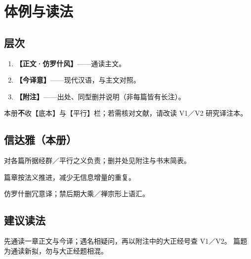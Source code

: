 
\chapter*{体例与读法}

\section*{层次}

\begin{enumerate}[label=\textbf{\arabic*.}]
  \item \textbf{【正文·仿罗什风】}——通读主文。
  \item \textbf{【今译意】}——现代汉语，与主文对照。
  \item \textbf{【附注】}——出处、同型删并说明（非每篇皆有长注）。
\end{enumerate}

\noindent 本册\textbf{不}收【底本】与【平行】栏；若需核对文献，请改读 V1／V2 研究译注本。

\section*{信达雅（本册）}

\begin{description}[style=nextline,leftmargin=3em]
  \item[信] 对各篇所据经群／平行之义负责；删并处见附注与书末简表。
  \item[达] 篇章按法义推进，减少无信息增量的重复。
  \item[雅] 仿罗什删冗意译；禁后期大乘／禅宗形上语汇。
\end{description}

\section*{建议读法}

先通读一章正文与今译；遇名相疑问，再以附注中的大正经号查 V1／V2。
篇题为通读新拟，勿与大正经题相混。

\clearpage
